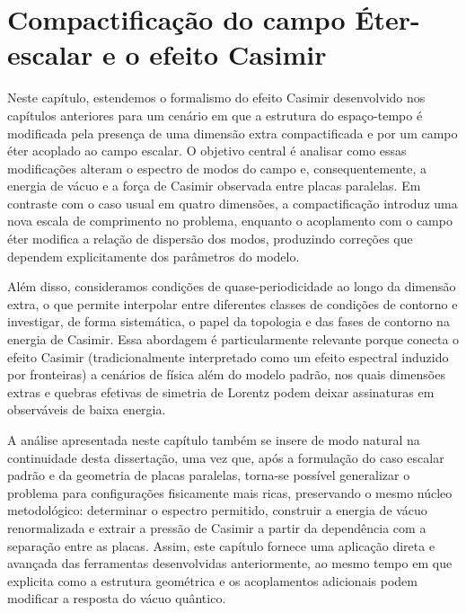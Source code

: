 \chapter[Compactificação do campo Éter-Escalar]{Compactificação do campo Éter-escalar e o efeito Casimir}

Neste capítulo, estendemos o formalismo do efeito Casimir desenvolvido nos capítulos anteriores para um cenário em que a estrutura do espaço-tempo é modificada pela presença de uma dimensão extra compactificada e por um campo éter acoplado ao campo escalar. O objetivo central é analisar como essas modificações alteram o espectro de modos do campo e, consequentemente, a energia de vácuo e a força de Casimir observada entre placas paralelas. Em contraste com o caso usual em quatro dimensões, a compactificação introduz uma nova escala de comprimento no problema, enquanto o acoplamento com o campo éter modifica a relação de dispersão dos modos, produzindo correções que dependem explicitamente dos parâmetros do modelo.

Além disso, consideramos condições de quase-periodicidade ao longo da dimensão extra, o que permite interpolar entre diferentes classes de condições de contorno e investigar, de forma sistemática, o papel da topologia e das fases de contorno na energia de Casimir. Essa abordagem é particularmente relevante porque conecta o efeito Casimir (tradicionalmente interpretado como um efeito espectral induzido por fronteiras) a cenários de física além do modelo padrão, nos quais dimensões extras e quebras efetivas de simetria de Lorentz podem deixar assinaturas em observáveis de baixa energia.

A análise apresentada neste capítulo também se insere de modo natural na continuidade desta dissertação, uma vez que, após a formulação do caso escalar padrão e da geometria de placas paralelas, torna-se possível generalizar o problema para configurações fisicamente mais ricas, preservando o mesmo núcleo metodológico: determinar o espectro permitido, construir a energia de vácuo renormalizada e extrair a pressão de Casimir a partir da dependência com a separação entre as placas. Assim, este capítulo fornece uma aplicação direta e avançada das ferramentas desenvolvidas anteriormente, ao mesmo tempo em que explicita como a estrutura geométrica e os acoplamentos adicionais podem modificar a resposta do vácuo quântico.




%
